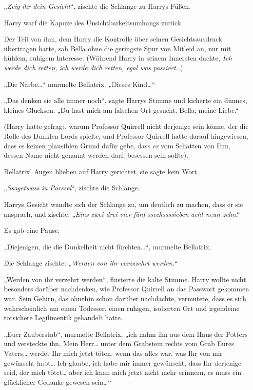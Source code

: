{„\emph{Zeig ihr dein Gesicht}“, zischte die Schlange zu Harrys Füßen.

Harry warf die Kapuze des Unsichtbarkeitsumhangs zurück.

Der Teil von ihm, dem Harry die Kontrolle über seinen Gesichtsausdruck übertragen hatte, sah Bella ohne die geringste Spur von Mitleid an, nur mit kühlem, ruhigem Interesse. (Während Harry in seinem Innersten dachte, \emph{Ich werde dich retten, ich werde dich retten, egal was passiert}…)

„Die Narbe…“ murmelte Bellatrix. „Dieses Kind…“

„Das denken sie alle immer noch“, sagte Harrys Stimme und kicherte ein dünnes, kleines Glucksen. „Du hast mich am falschen Ort gesucht, Bella, meine Liebe.“

(Harry hatte gefragt, warum Professor Quirrell nicht derjenige sein könne, der die Rolle des Dunklen Lords spielte, und Professor Quirrell hatte darauf hingewiesen, dass es keinen plausiblen Grund dafür gebe, dass \emph{er} vom Schatten von Ihm, dessen Name nicht genannt werden darf, besessen sein sollte).

Bellatrix' Augen blieben auf Harry gerichtet, sie sagte kein Wort.

„\emph{Ssagetwass} \emph{in} \emph{Parssel}“, zischte die Schlange.

Harrys Gesicht wandte sich der Schlange zu, um deutlich zu machen, dass er sie ansprach, und zischte: „\emph{Eins zwei drei vier fünf} \emph{ssechssssieben} \emph{acht neun zehn}.“

Es gab eine Pause.

„Diejenigen, die die Dunkelheit nicht fürchten…“, murmelte Bellatrix.

Die Schlange zischte: „\emph{Werden von ihr} \emph{verzzzehrt} \emph{werden.}“

„Werden von ihr verzehrt werden“, flüsterte die kalte Stimme. Harry wollte nicht besonders darüber nachdenken, wie Professor Quirrell an das Passwort gekommen war. Sein Gehirn, das ohnehin schon darüber nachdachte, vermutete, dass es sich wahrscheinlich um einen Todesser, einen ruhigen, isolierten Ort und irgendeine totsichere Legilimentik gehandelt hatte.

„Euer Zauberstab“, murmelte Bellatrix, „ich nahm ihn aus dem Haus der Potters und versteckte ihn, Mein Herr… unter dem Grabstein rechts vom Grab Eures Vaters… werdet Ihr mich jetzt töten, wenn das alles war, was Ihr von mir gewünscht habt… Ich glaube, ich habe mir immer gewünscht, dass Ihr derjenige seid, der mich tötet… aber ich kann mich jetzt nicht mehr erinnern, es muss ein glücklicher Gedanke gewesen sein…“

}
